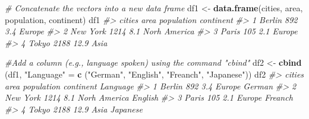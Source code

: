\documentclass[
]{book}
\newenvironment{Shaded}{\begin{snugshade}}{\end{snugshade}}
\newcommand{\CommentTok}[1]{\textcolor[rgb]{0.56,0.35,0.01}{\textit{#1}}}
\newcommand{\FunctionTok}[1]{\textcolor[rgb]{0.13,0.29,0.53}{\textbf{#1}}}
\newcommand{\NormalTok}[1]{#1}
\newcommand{\OtherTok}[1]{\textcolor[rgb]{0.56,0.35,0.01}{#1}}
\newcommand{\StringTok}[1]{\textcolor[rgb]{0.31,0.60,0.02}{#1}}
\theoremstyle{definition}
\theoremstyle{definition}
\theoremstyle{definition}
\theoremstyle{definition}
\theoremstyle{remark}
\begin{document}
\begin{Shaded}
\begin{Highlighting}[]
\CommentTok{\# Concatenate the vectors into a new data frame}
\NormalTok{df1 }\OtherTok{\textless{}{-}} \FunctionTok{data.frame}\NormalTok{(cities, area, population, continent)}
\NormalTok{df1}
\CommentTok{\#\textgreater{}     cities area population    continent}
\CommentTok{\#\textgreater{} 1   Berlin  892        3.4       Europe}
\CommentTok{\#\textgreater{} 2 New York 1214        8.1 Norh America}
\CommentTok{\#\textgreater{} 3    Paris  105        2.1       Europe}
\CommentTok{\#\textgreater{} 4    Tokyo 2188       12.9         Asia}

\CommentTok{\#Add a column (e.g., language spoken) using the command "cbind"}
\NormalTok{df2 }\OtherTok{\textless{}{-}} \FunctionTok{cbind}\NormalTok{ (df1, }\StringTok{"Language"} \OtherTok{=} \FunctionTok{c}\NormalTok{ (}\StringTok{"German"}\NormalTok{, }\StringTok{"English"}\NormalTok{, }\StringTok{"Freanch"}\NormalTok{, }\StringTok{"Japanese"}\NormalTok{))}
\NormalTok{df2}
\CommentTok{\#\textgreater{}     cities area population    continent Language}
\CommentTok{\#\textgreater{} 1   Berlin  892        3.4       Europe   German}
\CommentTok{\#\textgreater{} 2 New York 1214        8.1 Norh America  English}
\CommentTok{\#\textgreater{} 3    Paris  105        2.1       Europe  Freanch}
\CommentTok{\#\textgreater{} 4    Tokyo 2188       12.9         Asia Japanese}
\end{Highlighting}
\end{Shaded}
\end{document}
